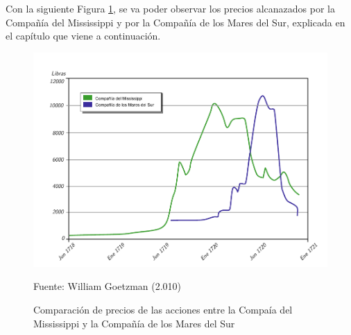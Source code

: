 Con la siguiente Figura \ref{fig:ComparaMississippiMaresSur}, se va poder observar los precios alcanazados por la Compañía del Mississippi y por la Compañía de los Mares del Sur, explicada en el capítulo que viene a continuación.

\begin{figure}[!h] 
\caption{Comparación de precios de las acciones entre la Compaía del Mississippi y la Compañía de los Mares del Sur} 
\centering \includegraphics[width=150mm]{capitulos/graficos/ComparaMississippiMaresSur} 
\label{fig:ComparaMississippiMaresSur} 

	\footnotesize
	Fuente: William Goetzman (2.010)

\end{figure}
